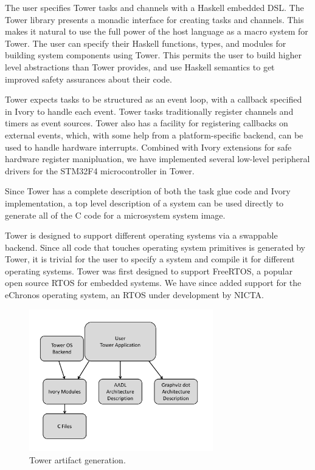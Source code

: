 The user specifies Tower tasks and channels with a Haskell embedded DSL. The
Tower library presents a monadic interface for creating tasks and channels.
This makes it natural to use the full power of the host language as a macro
system for Tower. The user can specify their Haskell functions, types, and
modules for building system components using Tower. This permits the user to
build higher level abstractions than Tower provides, and use Haskell semantics
to get improved safety assurances about their code.

Tower expects tasks to be structured as an event loop, with a callback specified
in Ivory to handle each event. Tower tasks traditionally register channels and
timers as event sources. Tower also has a facility for registering callbacks on
external events, which, with some help from a platform-specific backend, can
be used to handle hardware interrupts. Combined with Ivory extensions for safe
hardware register manipluation, we have implemented several low-level peripheral
drivers for the STM32F4 microcontroller in Tower.

Since Tower has a complete description of both the task glue code and Ivory
implementation, a top level description of a system can be used directly to
generate all of the C code for a microsystem system image.

Tower is designed to support different operating systems via a swappable
backend. Since all code that touches operating system primitives is generated by
Tower, it is trivial for the user to specify a system and compile it for
different operating systems. Tower was first designed to support FreeRTOS, a
popular open source RTOS for embedded systems. We have since added support for
the eChronos operating system, an RTOS under development by NICTA.

\begin{figure}
  \begin{center}
\includegraphics[width=8cm]{figures/tower-artifacts-dia}
  \end{center}
  \caption[Tower artifacts]{Tower artifact generation.}
\label{fig:towerArtifacts}
\end{figure}

